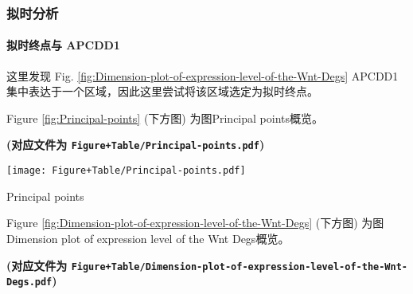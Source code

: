 \documentclass[
]{article}
\newenvironment{Shaded}{\begin{snugshade}}{\end{snugshade}}
\newcommand{\DataTypeTok}[1]{\textcolor[rgb]{0.13,0.29,0.53}{#1}}
\newcommand{\DecValTok}[1]{\textcolor[rgb]{0.00,0.00,0.81}{#1}}
\newcommand{\KeywordTok}[1]{\textcolor[rgb]{0.13,0.29,0.53}{\textbf{#1}}}
\newcommand{\NormalTok}[1]{#1}
\newcommand{\OperatorTok}[1]{\textcolor[rgb]{0.81,0.36,0.00}{\textbf{#1}}}
\newcommand{\StringTok}[1]{\textcolor[rgb]{0.31,0.60,0.02}{#1}}
\begin{document}
\hypertarget{ux62dfux65f6ux5206ux6790}{%
\subsubsection{拟时分析}\label{ux62dfux65f6ux5206ux6790}}

\hypertarget{ux62dfux65f6ux7ec8ux70b9ux4e0e-apcdd1}{%
\paragraph{拟时终点与 APCDD1}\label{ux62dfux65f6ux7ec8ux70b9ux4e0e-apcdd1}}

这里发现 Fig. \ref{fig:Dimension-plot-of-expression-level-of-the-Wnt-Degs}
APCDD1 集中表达于一个区域，因此这里尝试将该区域选定为拟时终点。

\begin{Shaded}
\end{Shaded}

Figure \ref{fig:Principal-points} (下方图) 为图Principal points概览。

\textbf{(对应文件为 \texttt{Figure+Table/Principal-points.pdf})}

\def\@captype{figure}
\begin{center}
\texttt{[image: Figure+Table/Principal-points.pdf]}
\caption{Principal points}\label{fig:Principal-points}
\end{center}

Figure \ref{fig:Dimension-plot-of-expression-level-of-the-Wnt-Degs} (下方图) 为图Dimension plot of expression level of the Wnt Degs概览。

\textbf{(对应文件为 \texttt{Figure+Table/Dimension-plot-of-expression-level-of-the-Wnt-Degs.pdf})}
\end{document}
